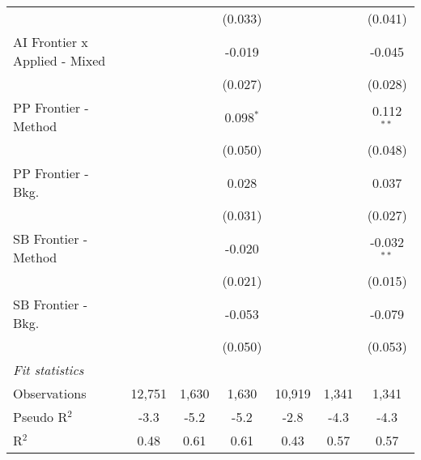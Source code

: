 \begin{tabular}{lcccccc}
                                 &             &         & (0.033)     &              &              & (0.041)\\   
   AI Frontier x Applied - Mixed &             &         & -0.019      &              &              & -0.045\\   
                                 &             &         & (0.027)     &              &              & (0.028)\\   
   PP Frontier - Method          &             &         & 0.098$^{*}$ &              &              & 0.112$^{**}$\\   
                                 &             &         & (0.050)     &              &              & (0.048)\\   
   PP Frontier - Bkg.            &             &         & 0.028       &              &              & 0.037\\   
                                 &             &         & (0.031)     &              &              & (0.027)\\   
   SB Frontier - Method          &             &         & -0.020      &              &              & -0.032$^{**}$\\   
                                 &             &         & (0.021)     &              &              & (0.015)\\   
   SB Frontier - Bkg.            &             &         & -0.053      &              &              & -0.079\\   
                                 &             &         & (0.050)     &              &              & (0.053)\\   
   \midrule
   \emph{Fit statistics}\\
   Observations                  & 12,751      & 1,630   & 1,630       & 10,919       & 1,341        & 1,341\\  
   Pseudo R$^2$                  & -3.3        & -5.2    & -5.2        & -2.8         & -4.3         & -4.3\\  
   R$^2$                         & 0.48        & 0.61    & 0.61        & 0.43         & 0.57         & 0.57\\  
   

\end{tabular}

